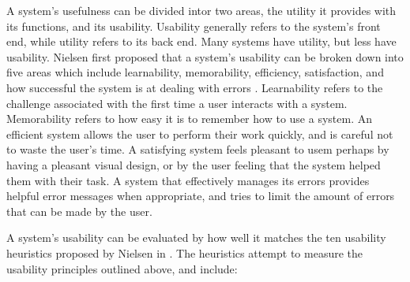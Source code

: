 A system's usefulness can be divided intor two areas, the utility it provides with its
functions, and its usability. Usability generally refers to the system's front end, while
utility refers to its back end. Many systems have utility, but less have usability. Nielsen
first proposed that a system's usability can be broken down into five areas which include
learnability, memorability, efficiency, satisfaction, and how successful the system is at
dealing with errors \cite[p22]{nielsen1994}. Learnability refers to the challenge associated
with the first time a user interacts with a system. Memorability refers to how easy it is
to remember how to use a system. An efficient system allows the user to perform their work
quickly, and is careful not to waste the user's time. A satisfying system feels pleasant to
usem perhaps by having a pleasant visual design, or by the user feeling that the system
helped them with their task. A system that effectively manages its errors provides helpful
error messages when appropriate, and tries to limit the amount of errors that can be made by 
the user.

A system's usability can be evaluated by how well it matches the ten usability heuristics
proposed by Nielsen in \cite{nielsen2005}. The heuristics attempt to measure the usability
principles outlined above, and include:

